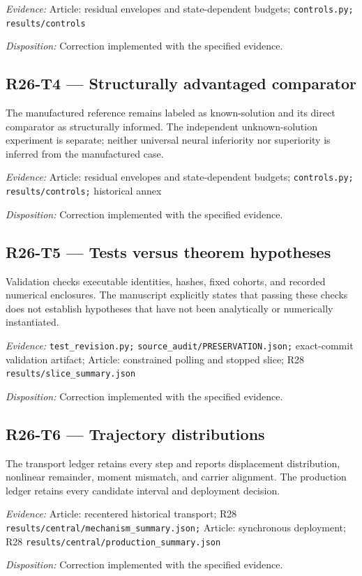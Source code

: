 \emph{Evidence:} Article: residual envelopes and state-dependent budgets; \nolinkurl{controls.py;} \nolinkurl{results/controls}

\emph{Disposition:} Correction implemented with the specified evidence.
\subsection{R26-T4 --- Structurally advantaged comparator}
The manufactured reference remains labeled as known-solution and its direct comparator as structurally informed. The independent unknown-solution experiment is separate; neither universal neural inferiority nor superiority is inferred from the manufactured case.

\emph{Evidence:} Article: residual envelopes and state-dependent budgets; \nolinkurl{controls.py;} \nolinkurl{results/controls;} historical annex

\emph{Disposition:} Correction implemented with the specified evidence.
\subsection{R26-T5 --- Tests versus theorem hypotheses}
Validation checks executable identities, hashes, fixed cohorts, and recorded numerical enclosures. The manuscript explicitly states that passing these checks does not establish hypotheses that have not been analytically or numerically instantiated.

\emph{Evidence:} \nolinkurl{test_revision.py;} \nolinkurl{source_audit/PRESERVATION.json;} exact-commit validation artifact; Article: constrained polling and stopped slice; R28 \nolinkurl{results/slice_summary.json}

\emph{Disposition:} Correction implemented with the specified evidence.
\subsection{R26-T6 --- Trajectory distributions}
The transport ledger retains every step and reports displacement distribution, nonlinear remainder, moment mismatch, and carrier alignment. The production ledger retains every candidate interval and deployment decision.

\emph{Evidence:} Article: recentered historical transport; R28 \nolinkurl{results/central/mechanism_summary.json;} Article: synchronous deployment; R28 \nolinkurl{results/central/production_summary.json}

\emph{Disposition:} Correction implemented with the specified evidence.
